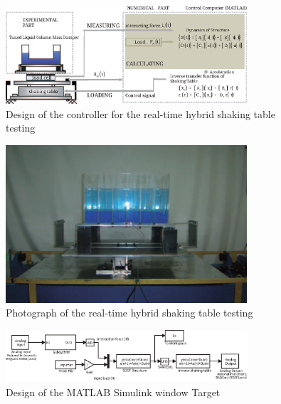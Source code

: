 \begin{figure}[ht]
\centering
\includegraphics[width=0.8\textwidth] {figure/5-16.eps}
\caption{Design of the controller for the real-time hybrid shaking table testing}
\label{fig:5-16}
\end{figure}

\begin{figure}[ht]
\centering
\includegraphics[width=0.8\textwidth] {figure/5-17.eps}
\caption{Photograph of the real-time hybrid shaking table testing}
\label{fig:5-17}
\end{figure}

\begin{figure}[ht]
\centering
\includegraphics[width=0.8\textwidth] {figure/5-18.eps}
\caption{Design of the MATLAB Simulink window Target}
\label{fig:5-18}
\end{figure}








\clearpage

